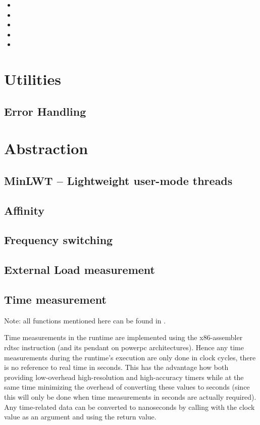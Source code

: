 \begin{itemize} 
	\item {} 
	\item {} 
	\item {} 
	\item {} 
	\item {} 
\end{itemize}


\section{Utilities} 
\subsection{Error Handling} 
\section{Abstraction}
\subsection{MinLWT -- Lightweight user-mode threads} 
\subsection{Affinity}
\subsection{Frequency switching} 
\subsection{External Load measurement}
\subsection{Time measurement} 
\label{sec:runtime.time.measurement}

Note: all functions mentioned here can be found in .


Time measurements in the runtime are implemented using the x86-assembler rdtsc
instruction (and its pendant on powerpc architectures). Hence any time
measurements during the runtime's execution are only done in clock cycles, there
is no reference to real time in seconds. This has the advantage how both
providing low-overhead high-resolution and high-accuracy timers while at the
same time minimizing the overhead of converting these values to seconds (since
this will only be done when time measurements in seconds are actually required).
Any time-related data can be converted to nanoseconds by calling
 with the clock value as an
argument and using the return value.

